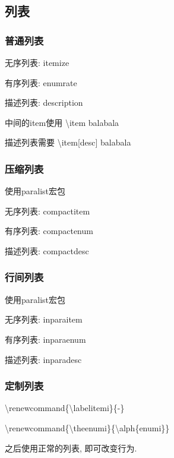 \documentclass[11pt]{article}
\begin{document}
\subsection{列表}

\subsubsection{普通列表}

无序列表: itemize

有序列表: enumrate

描述列表: description

中间的item使用 \textbackslash{item} balabala

描述列表需要 \textbackslash{item}[desc] balabala

\subsubsection{压缩列表}

使用paralist宏包

无序列表: compactitem

有序列表: compactenum

描述列表: compactdesc

\subsubsection{行间列表}

使用paralist宏包

无序列表: inparaitem

有序列表: inparaenum

描述列表: inparadesc

\subsubsection{定制列表}

\textbackslash{renewcommand}\{\textbackslash{labelitemi}\}\{-\}

\textbackslash{renewcommand}\{\textbackslash{theenumi}\}\{\textbackslash{alph}\{enumi\}\}

之后使用正常的列表, 即可改变行为.\\

\end{document}
